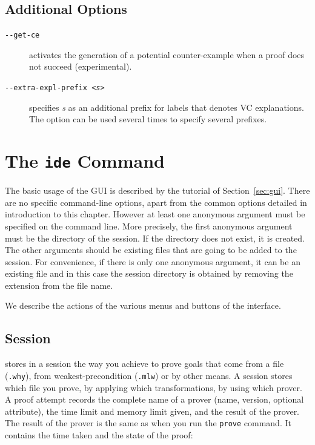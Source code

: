 \subsection{Additional Options}
\label{sec:proveoptions}

\begin{description}
\item[\texttt{-{}-get-ce}] activates the generation of a potential
counter-example when a proof does not succeed (experimental).
\item[\texttt{-{}-extra-expl-prefix \textsl{<s>}}] specifies
  \textsl{s} as an additional prefix for labels that denotes VC
  explanations. The option can be used several times to specify
  several prefixes.
\end{description}

\section{The \texttt{ide} Command}
\label{sec:ideref}

The basic usage of the GUI is described by the tutorial of
Section~\ref{sec:gui}. There are no specific command-line options,
apart from the common options detailed in introduction to this
chapter. However at least one anonymous argument must be specified on
the command line. More precisely, the first anonymous argument must be
the directory of the session. If the directory does not exist, it is
created. The other arguments should be existing files that are going
to be added to the session. For convenience,
if there is only one anonymous argument, it can be an existing file and
in this case the session directory is obtained by removing the extension
from the file name.

We describe the actions of the various menus and buttons of the
interface.

\subsection{Session}
\label{sec:idref:session}
\why stores in a session the way you achieve to prove goals that come
from a file (\texttt{.why}), from weakest-precondition (\texttt{.mlw}) or by other
means. A session stores which file you prove, by applying which
transformations, by using which prover. A proof attempt records the
complete name of a prover (name, version, optional attribute), the
time limit and memory limit given, and the result of the prover. The
result of the prover is the same as when you run the \texttt{prove} command. It
contains the time taken and the state of the proof:

